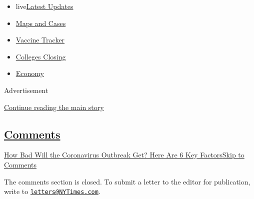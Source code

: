\begin{itemize}
\tightlist
\item
  live\href{https://www.nytimes3xbfgragh.onion/2020/08/20/world/coronavirus-covid.html?name=styln-coronavirus-national\&region=TOP_BANNER\&variant=undefined\&block=storyline_menu_recirc\&action=click\&pgtype=Interactive\&impression_id=d885a9f1-e387-11ea-b8ef-a3e158d39ea6}{Latest
  Updates}
\item
  \href{https://www.nytimes3xbfgragh.onion/interactive/2020/us/coronavirus-us-cases.html?name=styln-coronavirus-national\&region=TOP_BANNER\&variant=undefined\&block=storyline_menu_recirc\&action=click\&pgtype=Interactive\&impression_id=d885d100-e387-11ea-b8ef-a3e158d39ea6}{Maps
  and Cases}
\item
  \href{https://www.nytimes3xbfgragh.onion/interactive/2020/science/coronavirus-vaccine-tracker.html?name=styln-coronavirus-national\&region=TOP_BANNER\&variant=undefined\&block=storyline_menu_recirc\&action=click\&pgtype=Interactive\&impression_id=d885d101-e387-11ea-b8ef-a3e158d39ea6}{Vaccine
  Tracker}
\item
  \href{https://www.nytimes3xbfgragh.onion/2020/08/19/us/colleges-closing-covid.html?name=styln-coronavirus-national\&region=TOP_BANNER\&variant=undefined\&block=storyline_menu_recirc\&action=click\&pgtype=Interactive\&impression_id=d885d102-e387-11ea-b8ef-a3e158d39ea6}{Colleges
  Closing}
\item
  \href{https://www.nytimes3xbfgragh.onion/live/2020/08/20/business/stock-market-today-coronavirus?name=styln-coronavirus-national\&region=TOP_BANNER\&variant=undefined\&block=storyline_menu_recirc\&action=click\&pgtype=Interactive\&impression_id=d885d103-e387-11ea-b8ef-a3e158d39ea6}{Economy}
\end{itemize}

Advertisement

\protect\hyperlink{after-top}{Continue reading the main story}

\hypertarget{comments}{%
\subsection{\texorpdfstring{\protect\hyperlink{commentsContainer}{Comments}}{Comments}}\label{comments}}

\href{}{How Bad Will the Coronavirus Outbreak Get? Here Are 6 Key
Factors}\href{}{Skip to Comments}

The comments section is closed. To submit a letter to the editor for
publication, write to
\href{mailto:letters@NYTimes.com}{\nolinkurl{letters@NYTimes.com}}.


